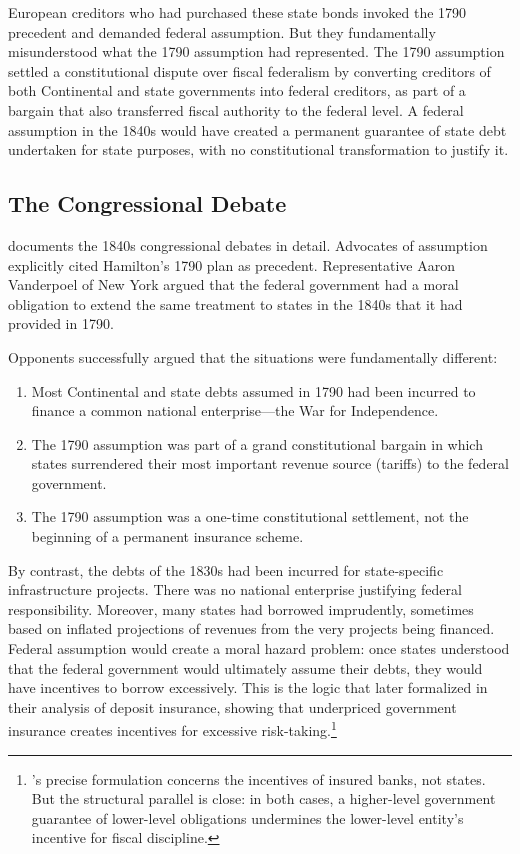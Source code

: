 \documentclass[12pt]{article}
\begin{document}
European creditors who had purchased these state bonds invoked the 1790
precedent and demanded federal assumption. But they fundamentally
misunderstood what the 1790 assumption had represented. The 1790
assumption settled a constitutional dispute over fiscal federalism by
converting creditors of both Continental and state governments into
federal creditors, as part of a bargain that also transferred fiscal
authority to the federal level. A federal assumption in the 1840s would
have created a permanent guarantee of state debt undertaken for state
purposes, with no constitutional transformation to justify it.

\subsection{The Congressional Debate}

\citet[pp.~165--198]{Ratchford1941} documents the 1840s congressional
debates in detail. Advocates of assumption explicitly cited Hamilton's
1790 plan as precedent. Representative Aaron Vanderpoel of New York
argued that the federal government had a moral obligation to extend the
same treatment to states in the 1840s that it had provided in 1790.

Opponents successfully argued that the situations were fundamentally
different:

\begin{enumerate}
\item Most Continental and state debts assumed in 1790 had been incurred 
  to finance a common national enterprise---the War for Independence.

\item The 1790 assumption was part of a grand constitutional bargain in
  which states surrendered their most important revenue source (tariffs)
  to the federal government.

\item The 1790 assumption was a one-time constitutional settlement, not
  the beginning of a permanent insurance scheme.
\end{enumerate}

By contrast, the debts of the 1830s had been incurred for state-specific
infrastructure projects. There was no national enterprise justifying
federal responsibility. Moreover, many states had borrowed imprudently,
sometimes based on inflated projections of revenues from the very
projects being financed. Federal assumption would create a moral hazard
problem: once states understood that the federal government would
ultimately assume their debts, they would have incentives to borrow
excessively. This is the logic that \citet{KarekenWallace1978} later
formalized in their analysis of deposit insurance, showing that
underpriced government insurance creates incentives for excessive
risk-taking.\footnote{\citeauthor{KarekenWallace1978}'s precise
formulation concerns the incentives of insured banks, not states. But
the structural parallel is close: in both cases, a higher-level
government guarantee of lower-level obligations undermines the
lower-level entity's incentive for fiscal discipline.}
\end{document}
